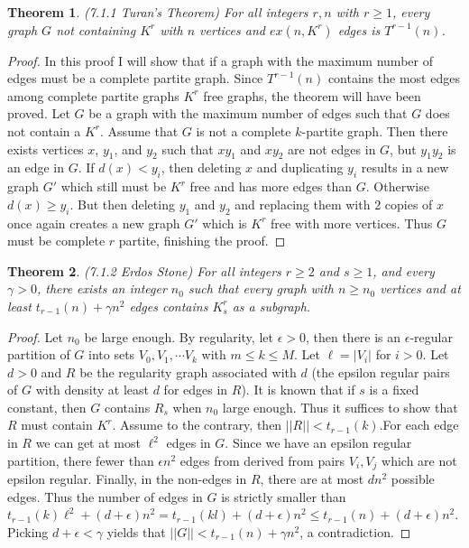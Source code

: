 \documentclass[12pt]{article}
\newtheorem{theorem}{Theorem}
\begin{document}
\begin{theorem} (7.1.1 Turan's Theorem) For all integers $r, n$ with
  $r \geq 1$, every graph $G$ not containing $K^r$ with $n$ vertices
  and $ex(n, K^r)$ edges is $T^{r-1}(n)$.
\end{theorem}
\begin{proof} In this proof I will show that if a graph with the
  maximum number of edges must be a complete partite graph. Since
  $T^{r-1}(n)$ contains the most edges among complete partite graphs
  $K^r$ free graphs, the theorem will have been proved. Let $G$ be a
  graph with the maximum number of edges such that $G$ does not
  contain a $K^r$. Assume that $G$ is not a complete $k$-partite
  graph. Then there exists vertices $x$, $y_1$, and $y_2$ such that
  $xy_1$ and $xy_2$ are not edges in $G$, but $y_1y_2$ is an edge in
  $G$. If $d(x) < y_i$, then deleting $x$ and duplicating $y_i$
  results in a new graph $G'$ which still must be $K^r$ free and has
  more edges than $G$. Otherwise $d(x) \geq y_i$. But then deleting
  $y_1$ and $y_2$ and replacing them with $2$ copies of $x$ once again
  creates a new graph $G'$ which is $K^r$ free with more
  vertices. Thus $G$ must be complete $r$ partite, finishing the
  proof.
\end{proof}

\begin{theorem} (7.1.2 Erdos Stone) For all integers $r \geq 2$ and
  $s \geq 1$, and every $\gamma > 0$, there exists an integer $n_0$
  such that every graph with $n \geq n_0$ vertices and at least
  $t_{r-1}(n) + \gamma n^2$ edges contains $K^{r}_{s}$ as a subgraph.
\end{theorem}
\begin{proof} Let $n_0$ be large enough. By regularity, let
  $\epsilon > 0$, then there is an $\epsilon$-regular partition of $G$
  into sets $V_0, V_1, \cdots V_k$ with $m \leq k \leq M$. Let
  $\ell = |V_i|$ for $i > 0$. Let $d > 0$ and $R$ be the regularity
  graph associated with $d$ (the epsilon regular pairs of $G$ with
  density at least $d$ for edges in $R$). It is known that if $s$ is a
  fixed constant, then $G$ contains $R_s$ when $n_0$ large
  enough. Thus it suffices to show that $R$ must contain $K^r$. Assume
  to the contrary, then $||R|| < t_{r -1}(k)$.For each edge in $R$ we
  can get at most $\ell^2$ edges in $G$. Since we have an epsilon
  regular partition, there fewer than $\epsilon n^2$ edges from
  derived from pairs $V_i, V_j$ which are not epsilon
  regular. Finally, in the non-edges in $R$, there are at most $d n^2$
  possible edges. Thus the number of edges in $G$ is strictly smaller
  than
  $t_{r-1}(k) \ell^2 + (d + \epsilon)n^2 = t_{r-1}(kl) + (d +
  \epsilon)n^2 \leq t_{r-1}(n) + (d + \epsilon)n^2$.  Picking
  $d + \epsilon < \gamma$ yields that
  $||G|| < t_{r - 1}(n) + \gamma n^2$, a contradiction.
\end{proof}
\end{document}
